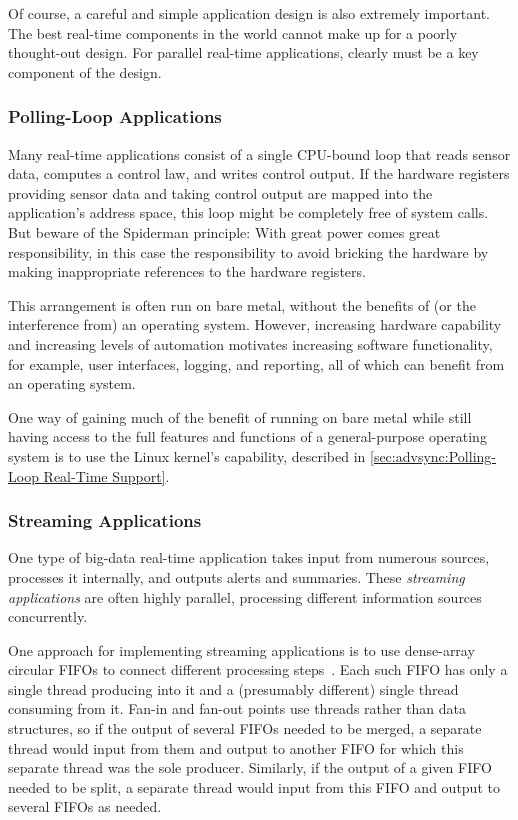 Of course, a careful and simple application design is also extremely
important.
The best real-time components in the world cannot make up for a
poorly thought-out design.
For parallel real-time applications,  clearly
must be a key component of the design.

\subsubsection{Polling-Loop Applications}
\label{sec:advsync:Polling-Loop Applications}

Many real-time applications consist of a single CPU-bound loop that
reads sensor data, computes a control law, and writes control output.
If the hardware registers providing sensor data and taking control
output are mapped into the application's address space, this loop
might be completely free of system calls.
But beware of the Spiderman principle: With great power comes great
responsibility, in this case the responsibility to avoid bricking the
hardware by making inappropriate references to the hardware registers.

This arrangement is often run on bare metal, without the benefits of
(or the interference from) an operating system.
However, increasing hardware capability and increasing levels of
automation motivates increasing software functionality, for example,
user interfaces, logging, and reporting, all of which can benefit from
an operating system.

One way of gaining much of the benefit of running on bare metal while
still having access to the full features and functions of a
general-purpose operating system is to use the Linux kernel's
 capability, described in
\cref{sec:advsync:Polling-Loop Real-Time Support}.

\subsubsection{Streaming Applications}
\label{sec:advsync:Streaming Applications}

One type of big-data real-time application takes input from numerous
sources, processes it internally, and outputs alerts and summaries.
These \emph{streaming applications} are often highly parallel, processing
different information sources concurrently.

One approach for implementing streaming applications is to use
dense-array circular FIFOs to connect different processing
steps~\cite{AdrianSutton2013LCA:Disruptor}.
Each such FIFO has only a single thread producing into it and a
(presumably different) single thread consuming from it.
Fan-in and fan-out points use threads rather than data structures,
so if the output of several FIFOs needed to be merged, a separate
thread would input from them and output to another FIFO for which
this separate thread was the sole producer.
Similarly, if the output of a given FIFO needed to be split, a separate
thread would input from this FIFO and output to several FIFOs as needed.

